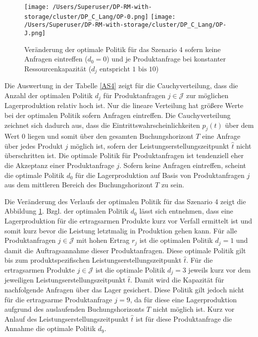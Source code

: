 \begin{figure}[h!]     
\begin{center}
\texttt{[image: /Users/Superuser/DP-RM-with-storage/cluster/DP\_C\_Lang/OP-0.png]}
\texttt{[image: /Users/Superuser/DP-RM-with-storage/cluster/DP\_C\_Lang/OP-J.png]}
    \caption{Veränderung der optimale Politik für das Szenario 4 sofern keine Anfragen eintreffen ($d_0=0$) und je Produktanfrage bei konstanter Ressourcenkapazität ($d_j\text{ entspricht }1\text{ bis }10$)}  \label{SV4}
  \end{center}
\end{figure}

Die Auswertung in der Tabelle \ref{AS4} zeigt für die Cauchyverteilung, dass die Anzahl der optimalen Politik $d_j$ für Produktanfragen $j\in\mathcal{J}$ zur möglichen Lagerproduktion relativ hoch ist. Nur die lineare Verteilung hat größere Werte bei der optimalen Politik sofern Anfragen eintreffen. Die Cauchyverteilung zeichnet sich dadurch aus, dass die Eintrittswahrscheinlichkeiten $p_j(t)$ über dem Wert $0$ liegen und somit über den gesamten Buchungshorizont $T$ eine Anfrage über jedes Produkt $j$ möglich ist, sofern der Leistungserstellungszeitpunkt $\hat t$ nicht überschritten ist. Die optimale Politik für Produktanfragen ist tendenziell eher die Akzeptanz einer Produktanfrage $j$. Sofern keine Anfragen eintreffen, scheint die optimale Politik $d_0$ für die Lagerproduktion auf Basis von Produktanfragen $j$ aus dem mittleren Bereich des Buchungshorizont $T$ zu sein.

Die Veränderung des Verlaufs der optimalen Politik für das Szenario 4 zeigt die Abbildung \ref{SV4}. Bzgl. der optimalen Politik $d_0$ lässt sich entnehmen, dass eine Lagerproduktion für die ertragsarmen Produkte kurz vor Verfall ermittelt ist und somit kurz bevor die Leistung letztmalig in Produktion gehen kann. Für alle Produktanfragen $j\in\mathcal{J}$ mit hohen Ertrag $r_j$ ist die optimalen Politik $d_j=1$ und damit die Auftragsannahme dieser Produktanfragen. Diese optimale Politik gilt bis zum produktspezifischen Leistungserstellungszeitpunkt $\hat t$. Für die ertragsarmen Produkte $j\in\mathcal{J}$ ist die optimale Politik $d_j=3$ jeweils kurz vor dem jeweiligen Leistungserstellungszeitpunkt $\hat t$. Damit wird die Kapazität für nachfolgende Anfragen über das Lager gesichert. Diese Politik gilt jedoch nicht für die ertragsarme Produktanfrage $j=9$, da für diese eine Lagerproduktion aufgrund des auslaufenden Buchungshorizonts $T$ nicht möglich ist. Kurz vor Anlauf des Leistungserstellungszeitpunkt $\hat t$ ist für diese Produktanfrage die Annahme die optimale Politik $d_9$.

